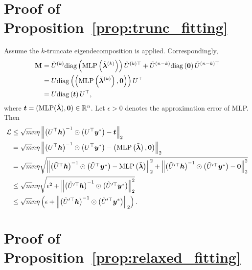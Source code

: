 \documentclass{article} %
\def\vlambda{{\bm\lambda}}
\begin{document}
	\section{Proof of Proposition~\ref{prop:trunc_fitting}}
	\label{sec:trunc_fitting}
	Assume the $k$-truncate eigendecomposition is applied.
	Correspondingly,
	\begin{equation}
		\begin{aligned}
			\rmM&=\tilde U^{(k)}\mathrm{diag}\left(\mathrm{MLP}\left(\tilde\vlambda^{(k)}\right)\right)\tilde U^{(k)\top}+\tilde U^{(n-k)}\mathrm{diag}\left(\mathbf 0\right)\tilde U^{(n-k)\top}\\
			&=U\mathrm{diag}\left(\left(\mathrm{MLP}\left(\tilde\vlambda^{(k)}\right),\mathbf 0\right)\right)U^{\top}\\
			&=U\mathrm{diag}\left(\vt\right)U^{\top},
		\end{aligned}
	\end{equation}
	where $\vt=(\mathrm{MLP}(\tilde\vlambda),\mathbf 0)\in\sR^n$.
	Let $\epsilon>0$ denotes the approximation error of MLP.
	Then
	\begin{equation}
		\begin{aligned}
			\gL&\leq\sqrt{m}n\eta\left\|\left(U^{\top}\vh\right)^{-1}\odot\left(U^{\top}\vy^*\right)-\vt\right\|_2\\
			&=\sqrt{m}n\eta\left\|\left(U^{\top}\vh\right)^{-1}\odot\left(U^{\top}\vy^*\right)-\left(\mathrm{MLP}\left(\tilde\vlambda\right),\mathbf 0\right)\right\|_2\\
			&=\sqrt{m}n\eta\sqrt{\left\|\left(\tilde U^{\top}\vh\right)^{-1}\odot\left(\tilde U^{\top}\vy^*\right)-\mathrm{MLP}\left(\tilde\vlambda\right)\right\|_2^2+\left\|\left(\tilde U^{\prime\top}\vh\right)^{-1}\odot\left(\tilde U^{\prime\top}\vy^*\right)-\mathbf 0\right\|_2^2}\\
			&\leq\sqrt{m}n\eta\sqrt{\epsilon^2+\left\|\left(\tilde U^{\prime\top}\vh\right)^{-1}\odot\left(\tilde U^{\prime\top}\vy^*\right)\right\|_2^2}\\
			&\leq\sqrt{m}n\eta\left(\epsilon+\left\|\left(\tilde U^{\prime\top}\vh\right)^{-1}\odot\left(\tilde U^{\prime\top}\vy^*\right)\right\|_2\right).
		\end{aligned}
	\end{equation}
	
	\section{Proof of Proposition~\ref{prop:relaxed_fitting}}
	\label{sec:relaxed_fitting}
	
\end{document}
